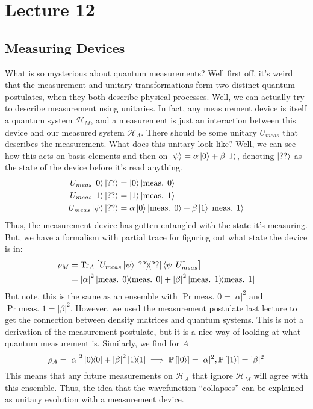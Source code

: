 \section{Lecture 12}

\subsection{Measuring Devices}
What is so mysterious about quantum measurements? Well first off, it's weird that the measurement and unitary transformations
form two distinct quantum postulates, when they both describe physical processes. Well, we can actually try to describe measurement using unitaries.
In fact, any measurement device is itself a quantum system $\mathcal{H}_M$, and a measurement is just an interaction between this device
and our measured system $\mathcal{H}_A$. There should be some unitary $U_{meas}$ that describes the measurement.
What does this unitary look like? Well, we can see how this acts on basis elements and then on $\ket{\psi} = \alpha \ket{0} + \beta \ket{1}$,
denoting $\ket{??}$ as the state of the device before it's read anything.
\begin{align*}
    U_{meas} \ket{0} \ket{??} &= \ket{0} \ket{\text{meas. } 0} \\
    U_{meas} \ket{1} \ket{??} &= \ket{1} \ket{\text{meas. } 1} \\
    U_{meas} \ket{\psi} \ket{??} &= \alpha \ket{0} \ket{\text{meas. } 0} + \beta  \ket{1} \ket{\text{meas. } 1}
\end{align*}
Thus, the measurement device has gotten entangled with the state it's measuring. But,
we have a formalism with partial trace for figuring out what state the device is in:
\begin{align*}
    \rho_M &= \Tr_A \qty[U_{meas} \ket{\psi} \ketbra{??} \bra{\psi} U_{meas}^{\dagger}] \\
    &=\qty|\alpha|^2 \ketbra{\text{meas. } 0} + \qty|\beta|^2 \ketbra{\text{meas. } 1}
\end{align*}
But note, this is the same as an ensemble with $\Pr{\text{meas. } 0} = |\alpha|^2$ and $\Pr{\text{meas. } 1} = |\beta|^2$. However,
we used the measurement postulate last lecture to get the connection between density matrices and quantum systems.
This is not a derivation of the measurement postulate, but it is a nice way of looking at what quantum measurement is. Similarly,
we find for $A$
\[ \rho_A = \qty|\alpha|^2 \ketbra{0} + \qty|\beta|^2 \ketbra{1} \implies \mathbb{P}\left[ \ket{0} \right] = |\alpha|^2, \mathbb{P}\left[ \ket{1} \right] = |\beta|^2 \]
This means that any future measurements on $\mathcal{H}_A$ that ignore $\mathcal{H}_M$ will agree with this ensemble. Thus, the idea
that the wavefunction ``collapses'' can be explained as unitary evolution with a measurement device.

